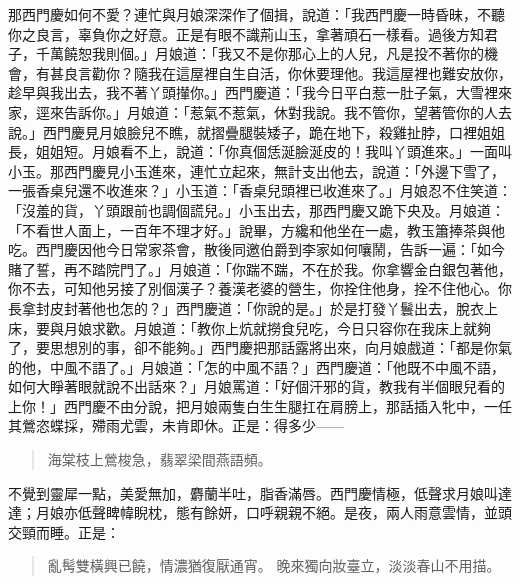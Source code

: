 那西門慶如何不愛？連忙與月娘深深作了個揖，說道：「我西門慶一時昏昧，不聽你之良言，辜負你之好意。正是有眼不識荊山玉，拿著頑石一樣看。過後方知君子，千萬饒恕我則個。」月娘道：「我又不是你那心上的人兒，凡是投不著你的機會，有甚良言勸你？隨我在這屋裡自生自活，你休要理他。我這屋裡也難安放你，趁早與我出去，我不著丫頭攆你。」西門慶道：「我今日平白惹一肚子氣，大雪裡來家，逕來告訴你。」月娘道：「惹氣不惹氣，休對我說。我不管你，望著管你的人去說。」西門慶見月娘臉兒不瞧，就摺疊腿裝矮子，跪在地下，殺雞扯脖，口裡姐姐長，姐姐短。月娘看不上，說道：「你真個恁涎臉涎皮的！我叫丫頭進來。」一面叫小玉。那西門慶見小玉進來，連忙立起來，無計支出他去，說道：「外邊下雪了，一張香桌兒還不收進來？」小玉道：「香桌兒頭裡已收進來了。」月娘忍不住笑道：「沒羞的貨，丫頭跟前也調個謊兒。」小玉出去，那西門慶又跪下央及。月娘道：「不看世人面上，一百年不理才好。」說畢，方纔和他坐在一處，教玉簫捧茶與他吃。西門慶因他今日常家茶會，散後同邀伯爵到李家如何嚷鬧，告訴一遍：「如今賭了誓，再不踏院門了。」月娘道：「你踹不踹，不在於我。你拿響金白銀包著他，你不去，可知他另接了別個漢子？養漢老婆的營生，你拴住他身，拴不住他心。你長拿封皮封著他也怎的？」西門慶道：「你說的是。」於是打發丫鬟出去，脫衣上床，要與月娘求歡。月娘道：「教你上炕就撈食兒吃，今日只容你在我床上就夠了，要思想別的事，卻不能夠。」西門慶把那話露將出來，向月娘戲道：「都是你氣的他，中風不語了。」月娘道：「怎的中風不語？」西門慶道：「他既不中風不語，如何大睜著眼就說不出話來？」月娘罵道：「好個汗邪的貨，教我有半個眼兒看的上你！」西門慶不由分說，把月娘兩隻白生生腿扛在肩膀上，那話插入牝中，一任其鶯恣蝶採，殢雨尤雲，未肯即休。正是：得多少——
\begin{quote}
海棠枝上鶯梭急，翡翠梁間燕語頻。
\end{quote}

不覺到靈犀一點，美愛無加，麝蘭半吐，脂香滿唇。西門慶情極，低聲求月娘叫達達；月娘亦低聲睥幃睨枕，態有餘妍，口呼親親不絕。是夜，兩人雨意雲情，並頭交頸而睡。正是：
\begin{quote}
亂髩雙橫興已饒，情濃猶復厭通宵。
晚來獨向妝臺立，淡淡春山不用描。
\end{quote}

